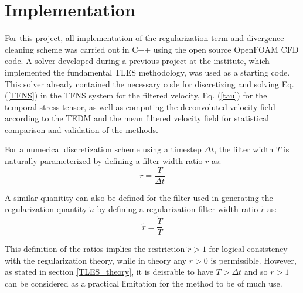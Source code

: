 \chapter{Implementation}


For this project, all implementation of the regularization term and divergence cleaning scheme was carried out in C++ using the open source OpenFOAM CFD code. A solver developed during a previous project at the institute, which implemented the fundamental TLES methodology, was used as a starting code. This solver already contained the necessary code for discretizing and solving Eq. (\ref{TFNS}) in the TFNS system for the filtered velocity, Eq. (\ref{tau}) for the temporal stress tensor, as well as computing the deconvoluted velocity field according to the TEDM and the mean filtered velocity field for statistical comparison and validation of the methods.

For a numerical discretization scheme using a timestep $\Delta t$, the filter width $T$ is naturally parameterized by defining a filter width ratio $r$ as:
\begin{equation} \label{r}
r=\frac{T}{\Delta t}
\end{equation}

A similar quanitity can also be defined for the filter used in generating the regularization quantity $\tilde{u}$ by defining a regularization filter width ratio $\tilde{r}$ as:
\begin{equation}
\tilde{r}=\frac{\tilde{T}}{T}
\end{equation}

This definition of the ratios implies the restriction $\tilde{r}>1$ for logical consistency with the regularization theory, while in theory any $r>0$ is permissible. However, as stated in section \ref{TLES_theory}, it is deisrable to have $T>\Delta t$ and so $r>1$ can be considered as a practical limitation for the method to be of much use.